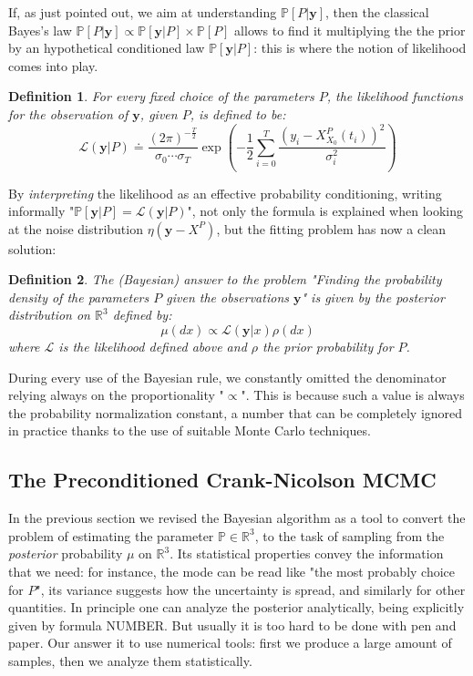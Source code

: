 \documentclass[8pt]{article}
\newtheorem{definition}{Definition}
\begin{document}
If, as just pointed out, we aim at understanding 
$\mathbb{P}[P | \textbf{y}]$, then the classical Bayes's law
$\mathbb{P}[P | \textbf{y}] \propto
	\mathbb{P}[\textbf{y} | P] \times \mathbb{P}[P]$
allows to find it multiplying the the prior  
by an hypothetical conditioned law $\mathbb{P}[\textbf{y} | P]$: this
is where the notion of likelihood comes into play.


\begin{definition}
For every fixed choice of the parameters $P$, the likelihood functions
for the observation of $\textbf{y}$, given $P$, is defined to be:
	\begin{equation}
	\mathcal{L}(\textbf{y}|P) \doteq 
		\frac{(2 \pi)^{- \frac{T}{2}}}
		{\sigma_0\cdots\sigma_{T}}
		\exp \left( -\frac{1}{2} 
		\sum_{i=0}^{T} 
		\frac{(y_i - X_{X_0}^P(t_i))^2}
		{\sigma_i^2}
		\right )
	\end{equation}
\end{definition}


By \emph{interpreting} the likelihood as an effective probability
conditioning, writing informally 
"$\mathbb{P}[\textbf{y}|P] = \mathcal{L}(\textbf{y}|P)$",
not only 
the formula is explained when looking at the noise
distribution $\eta(\textbf{y} - X^P)$, but the 
fitting problem has now a clean solution:

\begin{definition}
	The (Bayesian)
	answer to the problem "Finding the probability density of
	the parameters $P$ given the observations $\textbf{y}$"
	is given by the \emph{posterior}
	distribution on $\mathbb{R}^{3}$ defined by:
	\begin{equation}
		\mu(dx) \propto \mathcal{L}(\textbf{y} | x) \rho(dx)
	\end{equation}
	where $\mathcal{L}$ is the likelihood defined above
	and $\rho$ the prior probability for $P$.
\end{definition}


During every use of the Bayesian rule, we constantly omitted the denominator
relying always on the proportionality "$\propto$". 
This is because such a value is always the probability 
normalization constant,
a number that can be completely ignored in practice thanks to the use
of suitable Monte Carlo techniques.


\subsection{The Preconditioned Crank-Nicolson MCMC}
In the previous section we revised the Bayesian algorithm
as a tool to convert the problem of
estimating the parameter $\mathbb{P} \in \mathbb{R}^3$, to the task
of sampling from the \emph{posterior} probability $\mu$ on $\mathbb{R}^3$.
Its statistical properties convey the information that we need:
for instance, the mode can be read like "the most probably
choice for $P$", its variance suggests how the uncertainty
is spread, and similarly for other quantities.
In principle one can analyze the posterior analytically,
being explicitly given by formula NUMBER.
But usually it is too hard to be done with pen and paper.
Our answer it to use numerical tools: first we
produce a large amount of samples, then we analyze them
statistically.
\end{document}
